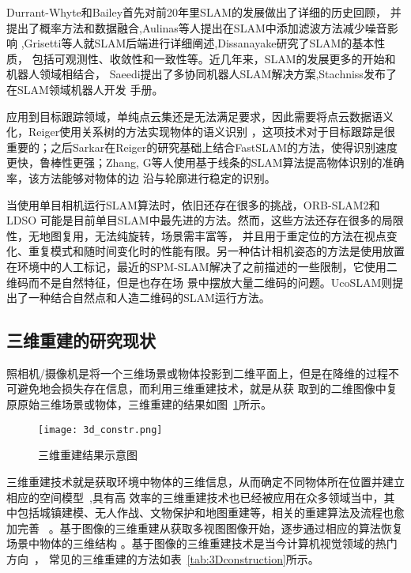 Durrant-Whyte和Bailey首先对前20年里SLAM的发展做出了详细的历史回顾，
并提出了概率方法和数据融合\cite{Gibbens2000A,durrant2006simultaneous},Aulinas等人提出在SLAM中添加滤波方法减少噪音影响
\cite{cadena2016past},Grisetti等人就SLAM后端进行详细阐述\cite{grisetti2010tutorial},Dissanayake研究了SLAM的基本性质，
包括可观测性、收敛性和一致性等\cite{dissanayake2011review}。近几年来，SLAM的发展更多的开始和机器人领域相结合， 
Saeedi提出了多协同机器人SLAM解决方案\cite{saeedi2016multiple},Stachniss发布了在SLAM领域机器人开发
手册\cite{stachniss2016simultaneous}。

应用到目标跟踪领域，单纯点云集还是无法满足要求，因此需要将点云数据语义化，Reiger使用关系树的方法实现物体的语义识别
\cite{sarkar2012slam}，这项技术对于目标跟踪是很重要的；之后Sarkar在Reiger的研究基础上结合FastSLAM的方法，使得识别速度
更快，鲁棒性更强；Zhang, G等人使用基于线条的SLAM算法\cite{zhang2015building}提高物体识别的准确率，该方法能够对物体的边
沿与轮廓进行稳定的识别。

当使用单目相机运行SLAM算法时，依旧还存在很多的挑战，ORB-SLAM2\cite{mur2017orb}和LDSO\cite{gao2018ldso}
可能是目前单目SLAM中最先进的方法。然而，这些方法还存在很多的局限性，无地图复用，无法纯旋转，场景需丰富等，
并且用于重定位的方法\cite{galvez2012bags}在视点变化、重复模式和随时间变化时的性能有限。另一种估计相机姿态的方法是使用放置
在环境中的人工标记，最近的SPM-SLAM\cite{munoz2019spm}解决了之前描述的一些限制，它使用二维码而不是自然特征，但是也存在场
景中摆放大量二维码的问题。UcoSLAM\cite{munoz2019ucoslam}则提出了一种结合自然点和人造二维码的SLAM运行方法。

\subsection{三维重建的研究现状}
\label{sec:1.2.2}
照相机/摄像机是将一个三维场景或物体投影到二维平面上，但是在降维的过程不可避免地会损失存在信息，而利用三维重建技术，就是从获
取到的二维图像中复原原始三维场景或物体，三维重建的结果如图~\ref{fig:3d_constr}所示。

\begin{figure}[H] %
    \centering
    \texttt{[image: 3d\_constr.png]}
    \caption{三维重建结果示意图}
    \label{fig:3d_constr}
  \end{figure}

三维重建技术就是获取环境中物体的三维信息，从而确定不同物体所在位置并建立相应的空间模型~\cite{feng2018reconstruction},具有高
效率的三维重建技术也已经被应用在众多领域当中，其中包括城镇建模、无人作战、文物保护和地图重建等，相关的重建算法及流程也愈加完善
~\cite{liu2018application}。基于图像的三维重建从获取多视图图像开始，逐步通过相应的算法恢复场景中物体的三维结构
\cite{rupnik20183d}。基于图像的三维重建技术是当今计算机视觉领域的热门方向~\cite{zhang2017data}，
常见的三维重建的方法如表~\ref{tab:3Dconstruction}所示。


